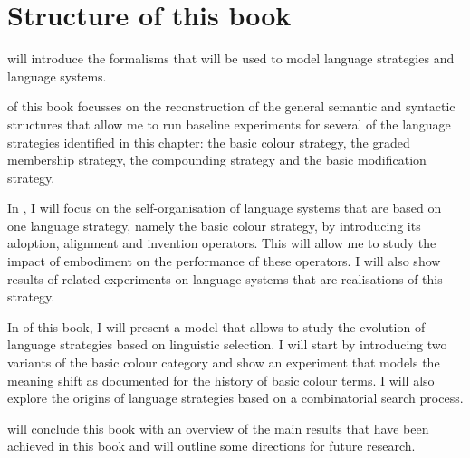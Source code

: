 \section{Structure of this book}

 will introduce the formalisms that will be 
used to model language strategies and language systems.

 of this book focusses on the
reconstruction of the general semantic and syntactic structures that
allow me to run baseline experiments for several of the language
strategies identified in this chapter: the basic colour strategy, the
graded membership strategy, the compounding strategy and the
basic modification strategy.

In , I will focus on the
self-organisation of language systems that are based on one language strategy,
namely the basic colour strategy, by introducing its adoption,
alignment and invention operators. This will allow me to study the
impact of embodiment on the performance of these operators. I will
also show results of related experiments on language systems that are
realisations of this strategy.

In  of this book, I
will present a model that allows to study the evolution of language
strategies based on linguistic selection. I will start by introducing
two variants of the basic colour category and show an experiment that
models the meaning shift as documented for the history of basic colour
terms. I will also explore the origins of language strategies based on
a combinatorial search process.

 will conclude this book with an overview of
the main results that have been achieved in this book and will
outline some directions for future research.
